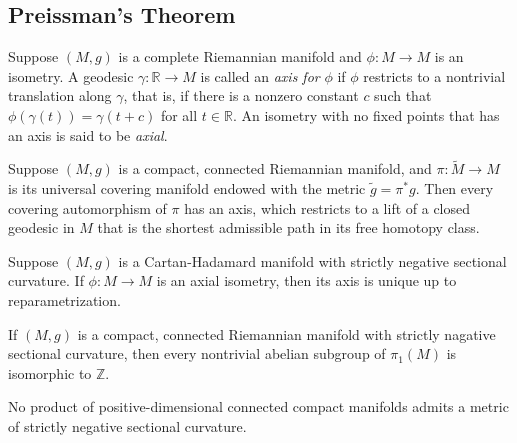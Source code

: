 \subsection{Preissman's Theorem}
\label{subsection-Preissman-theorem}

\begin{definition}
  \label{definition-axis}
  \label{definition-axial}
  Suppose \( (M, g) \) is a complete Riemannian manifold and \( \phi: M \to M \) is an isometry.
  A geodesic \( \gamma: \mathbb{R} \to M \) is called an \emph{axis for} \( \phi \) if \( \phi \) restricts to a nontrivial translation along \( \gamma \), that is, if there is a nonzero constant \( c \) such that \( \phi(\gamma(t)) = \gamma(t + c) \) for all \( t \in \mathbb{R} \).
  An isometry with no fixed points that has an axis is said to be \emph{axial}.
\end{definition}

\begin{lemma}
  \label{lemma-covering-automorphism-has-an-axis}
  Suppose \( (M, g) \) is a compact, connected Riemannian manifold, and \( \pi: \widetilde{M} \to M \) is its universal covering manifold endowed with the metric \( \tilde{g} = \pi^* g \).
  Then every covering automorphism of \( \pi \) has an axis, which restricts to a lift of a closed geodesic in \( M \) that is the shortest admissible path in its free homotopy class.
\end{lemma}

\begin{lemma}
  \label{lemma-unique-axis}
  Suppose \( (M, g) \) is a Cartan-Hadamard manifold with strictly negative sectional curvature.
  If \( \phi: M \to M \) is an axial isometry, then its axis is unique up to reparametrization.
\end{lemma}

\begin{theorem}[Preissman]
  \label{theorem-Preissman}
  If \( (M, g) \) is a compact, connected Riemannian manifold with strictly nagative sectional curvature, then every nontrivial abelian subgroup of \( \pi_1(M) \) is isomorphic to \( \mathbb{Z} \).
\end{theorem}

\begin{corollary}
  \label{corollary-Preissman}
  No product of positive-dimensional connected compact manifolds admits a metric of strictly negative sectional curvature.
\end{corollary}

